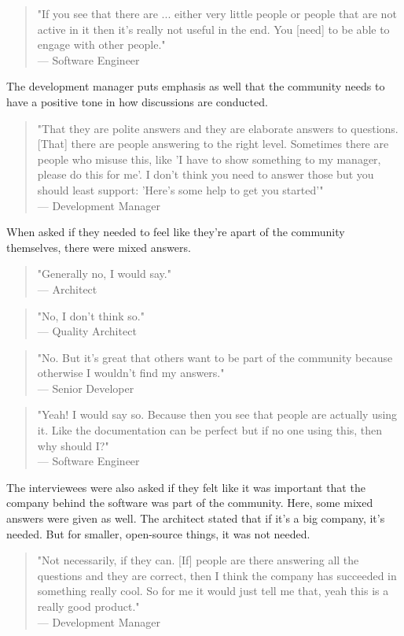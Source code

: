 \documentclass{cslthse-msc}
\begin{document}
    \begin{quote}
        "If you see that there are ... either very little people or people that are not active in it then it's really not useful in the end. You [need] to be able to engage with other people."\\--- Software Engineer
    \end{quote}
    The development manager puts emphasis as well that the community needs to have a positive tone in how discussions are conducted.
    \begin{quote}
        "That they are polite answers and they are elaborate answers to questions. [That] there are people answering to the right level. Sometimes there are people who misuse this, like 'I have to show something to my manager, please do this for me'. I don't think you need to answer those but you should least support: 'Here's some help to get you started'"\\--- Development Manager
    \end{quote}
    When asked if they needed to feel like they're apart of the community themselves, there were mixed answers.
    \begin{quote}
        "Generally no, I would say."\\ --- Architect
    \end{quote}
    \begin{quote}
        "No, I don't think so."\\--- Quality Architect
    \end{quote}
    \begin{quote}
        "No. But it's great that others want to be part of the community because otherwise I wouldn't find my answers."\\--- Senior Developer
    \end{quote}
    \begin{quote}
        "Yeah! I would say so. Because then you see that people are actually using it. Like the documentation can be perfect but if no one using this, then why should I?"\\--- Software Engineer
    \end{quote}
    The interviewees were also asked if they felt like it was important that the company behind the software was part of the community. Here, some mixed answers were given as well. The architect stated that if it's a big company, it's needed. But for smaller, open-source things, it was not needed.
    \begin{quote}
        "Not necessarily, if they can. [If] people are there answering all the questions and they are correct, then I think the company has succeeded in something really cool. So for me it would just tell me that, yeah this is a really good product."\\--- Development Manager
    \end{quote}
\end{document}

